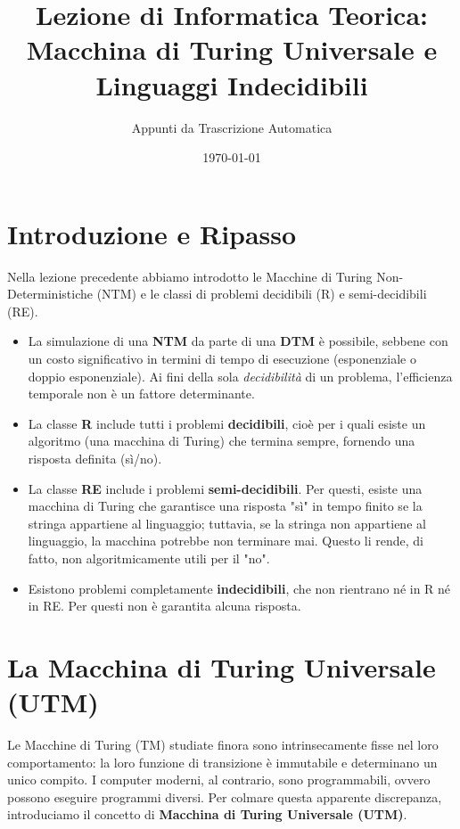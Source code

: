 \documentclass[a4paper]{article}
\title{Lezione di Informatica Teorica: Macchina di Turing Universale e Linguaggi Indecidibili}
\author{Appunti da Trascrizione Automatica}
\date{\today}
\begin{document}
\maketitle
\tableofcontents
\newpage

\section{Introduzione e Ripasso}

Nella lezione precedente abbiamo introdotto le Macchine di Turing Non-Deterministiche (NTM) e le classi di problemi decidibili (R) e semi-decidibili (RE).

\begin{itemize}
    \item La simulazione di una \textbf{NTM} da parte di una \textbf{DTM} è possibile, sebbene con un costo significativo in termini di tempo di esecuzione (esponenziale o doppio esponenziale). Ai fini della sola \textit{decidibilità} di un problema, l'efficienza temporale non è un fattore determinante.
    \item La classe \textbf{R} include tutti i problemi \textbf{decidibili}, cioè per i quali esiste un algoritmo (una macchina di Turing) che termina sempre, fornendo una risposta definita (sì/no).
    \item La classe \textbf{RE} include i problemi \textbf{semi-decidibili}. Per questi, esiste una macchina di Turing che garantisce una risposta "sì" in tempo finito se la stringa appartiene al linguaggio; tuttavia, se la stringa non appartiene al linguaggio, la macchina potrebbe non terminare mai. Questo li rende, di fatto, non algoritmicamente utili per il "no".
    \item Esistono problemi completamente \textbf{indecidibili}, che non rientrano né in R né in RE. Per questi non è garantita alcuna risposta.
\end{itemize}

\section{La Macchina di Turing Universale (UTM)}

Le Macchine di Turing (TM) studiate finora sono intrinsecamente fisse nel loro comportamento: la loro funzione di transizione è immutabile e determinano un unico compito. I computer moderni, al contrario, sono programmabili, ovvero possono eseguire programmi diversi. Per colmare questa apparente discrepanza, introduciamo il concetto di \textbf{Macchina di Turing Universale (UTM)}.
\end{document}
